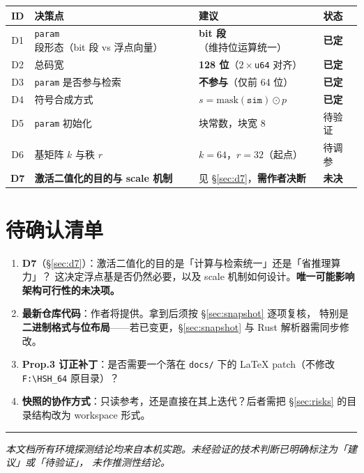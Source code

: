 \documentclass[11pt,a4paper]{ctexart}
\newcommand{\warn}[1]{\textcolor{warnred}{\textbf{#1}}}
\newcommand{\ok}[1]{\textcolor{okgreen}{\textbf{#1}}}
\theoremstyle{definition}
\begin{document}
\begin{center}
\begin{tabularx}{\textwidth}{@{}clXl@{}}
\toprule
\textbf{ID} & \textbf{决策点} & \textbf{建议} & \textbf{状态} \\
\midrule
D1 & \texttt{param} 段形态（bit 段 vs 浮点向量） & \textbf{bit 段}（维持位运算统一） & \ok{已定} \\
D2 & 总码宽 & \textbf{128 位}（$2\times$\texttt{u64} 对齐） & \ok{已定} \\
D3 & \texttt{param} 是否参与检索 & \textbf{不参与}（仅前 64 位） & \ok{已定} \\
D4 & 符号合成方式 & $s=\text{mask}(\texttt{sim})\odot p$ & \ok{已定} \\
D5 & \texttt{param} 初始化 & 块常数，块宽 8 & 待验证 \\
D6 & 基矩阵 $k$ 与秩 $r$ & $k=64$，$r=32$（起点） & 待调参 \\
\textbf{D7} & \textbf{激活二值化的目的与 scale 机制} & 见 \S\ref{sec:d7}，\warn{需作者决断} & \warn{未决} \\
\bottomrule
\end{tabularx}
\end{center}

\section{待确认清单}

\begin{enumerate}
\item \textbf{D7}（\S\ref{sec:d7}）：激活二值化的目的是「计算与检索统一」还是「省推理算力」？
      这决定浮点基是否仍然必要，以及 scale 机制如何设计。\warn{唯一可能影响架构可行性的未决项。}
\item \textbf{最新仓库代码}：作者将提供。拿到后须按 \S\ref{sec:snapshot} 逐项复核，
      特别是\textbf{二进制格式与位布局}——若已变更，\S\ref{sec:snapshot} 与 Rust 解析器需同步修改。
\item \textbf{Prop.3 订正补丁}：是否需要一个落在 \texttt{docs/} 下的 LaTeX patch（不修改
      \texttt{F:\textbackslash HSH\_64} 原目录）？
\item \textbf{快照的协作方式}：只读参考，还是直接在其上迭代？后者需把 \S\ref{sec:risks} 的目录结构改为 workspace 形式。
\end{enumerate}

\vspace{0.6cm}
\begin{center}
\color{rulegray}\rule{0.6\textwidth}{0.4pt}
\end{center}
\begin{center}
\small\itshape
本文档所有环境探测结论均来自本机实跑。未经验证的技术判断已明确标注为「建议」或「待验证」，
未作推测性结论。
\end{center}
\end{document}
